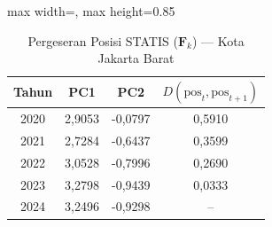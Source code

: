 \begin{table}[H]
\centering
\caption{Pergeseran Posisi STATIS ($\mathbf{F}_k$) --- Kota Jakarta Barat} \label{tab:app1jarak_statis_skor_kota_jakarta_barat}
\begin{adjustbox}{max width=\textwidth, max height=0.85\textheight}
\begin{tabular}{|c|c|c|c|}
\hline
\textbf{Tahun} & \textbf{PC1} & \textbf{PC2} & \textbf{$D(\text{pos}_t, \text{pos}_{t+1})$} \\
\hline
2020 & 2,9053 & -0,0797 & 0,5910 \\
2021 & 2,7284 & -0,6437 & 0,3599 \\
2022 & 3,0528 & -0,7996 & 0,2690 \\
2023 & 3,2798 & -0,9439 & 0,0333 \\
2024 & 3,2496 & -0,9298 & -- \\
\hline
\end{tabular}
\end{adjustbox}
\end{table}